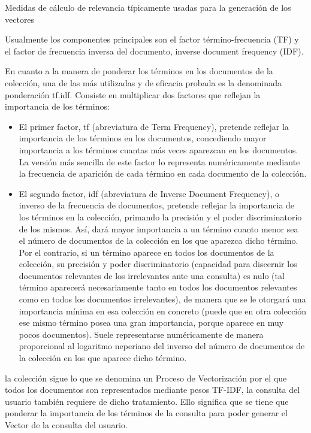 \documentclass{article}
\begin{document}
Medidas de cálculo de relevancia típicamente usadas para la generación de los vectores

Usualmente los componentes principales son el factor término-frecuencia (TF) y el factor de frecuencia inversa del documento, inverse document frequency (IDF).

En cuanto a la manera de ponderar los términos en los documentos de la colección, una de las más utilizadas y de eficacia probada es la denominada ponderación tf.idf. Consiste en multiplicar dos factores que reflejan la importancia de los términos:

\begin{itemize}
	\item El primer factor, tf (abreviatura de Term Frequency), pretende reflejar la importancia de los términos en los documentos, concediendo mayor importancia a los términos cuantas más veces aparezcan en los documentos. La versión más sencilla de este factor lo representa numéricamente mediante la frecuencia de aparición de cada término en cada documento de la colección.
	\item El segundo factor, idf (abreviatura de Inverse Document Frequency), o inverso de la frecuencia de documentos, pretende reflejar la importancia de los términos en la colección, primando la precisión y el poder discriminatorio de los mismos. Así, dará mayor importancia a un término cuanto menor sea el número de documentos de la colección en los que aparezca dicho término. Por el contrario, si un término aparece en todos los documentos de la colección, su precisión y poder discriminatorio (capacidad para discernir los documentos relevantes de los irrelevantes ante una consulta) es nulo (tal término aparecerá necesariamente tanto en todos los documentos relevantes como en todos los documentos irrelevantes), de manera que se le otorgará una importancia mínima en esa colección en concreto (puede que en otra colección ese mismo término posea una gran importancia, porque aparece en muy pocos documentos). Suele representarse numéricamente de manera proporcional al logaritmo neperiano del inverso del número de documentos de la colección en los que aparece dicho término.
\end{itemize}

la colección sigue lo que se denomina un Proceso de Vectorización por el que todos los documentos son representados mediante pesos TF-IDF, la consulta del usuario también requiere de dicho tratamiento. Ello significa que se tiene que ponderar la importancia de los términos de la consulta para poder generar el Vector de la consulta del usuario.
\end{document}
